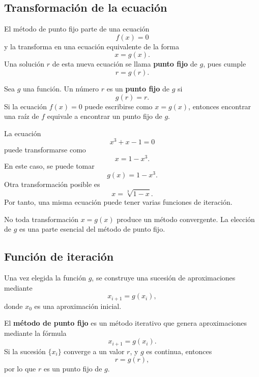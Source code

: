 \documentclass[a4,11pt]{aleph-notas}
\begin{document}
\subsection{Transformación de la ecuación}

El método de punto fijo parte de una ecuación
\[
    f(x)=0
\]
y la transforma en una ecuación equivalente de la forma
\[
    x=g(x).
\]
Una solución $r$ de esta nueva ecuación se llama \textbf{punto fijo} de $g$, pues cumple
\[
    r=g(r).
\]

\begin{defi}
    Sea $g$ una función. Un número $r$ es un \textbf{punto fijo} de $g$ si
    \[
        g(r)=r.
    \]
    Si la ecuación $f(x)=0$ puede escribirse como $x=g(x)$, entonces encontrar una raíz de $f$ equivale a encontrar un punto fijo de $g$.
\end{defi}

\begin{ejem}
    La ecuación
    \[
        x^3+x-1=0
    \]
    puede transformarse como
    \[
        x=1-x^3.
    \]
    En este caso, se puede tomar
    \[
        g(x)=1-x^3.
    \]
    Otra transformación posible es
    \[
        x=\sqrt[3]{1-x}.
    \]
    Por tanto, una misma ecuación puede tener varias funciones de iteración.
\end{ejem}

\begin{advertencia}
    No toda transformación $x=g(x)$ produce un método convergente. La elección de $g$ es una parte esencial del método de punto fijo.
\end{advertencia}

\subsection{Función de iteración}

Una vez elegida la función $g$, se construye una sucesión de aproximaciones mediante
\[
    x_{i+1}=g(x_i),
\]
donde $x_0$ es una aproximación inicial.

\begin{defi}
    El \textbf{método de punto fijo} es un método iterativo que genera aproximaciones mediante la fórmula
    \[
        x_{i+1}=g(x_i).
    \]
    Si la sucesión $\{x_i\}$ converge a un valor $r$, y $g$ es continua, entonces
    \[
        r=g(r),
    \]
    por lo que $r$ es un punto fijo de $g$.
\end{defi}

\begin{pscodigo}
\begin{function}[H]
\end{function}
\end{pscodigo}
\end{document}

